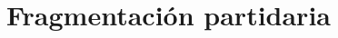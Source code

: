 \documentclass[a4paper,handout,mathserif,final,xcolor=dvipsnames,twocolumn]{beamer}
\begin{document}

          
\section{Fragmentación partidaria}
\end{document}
